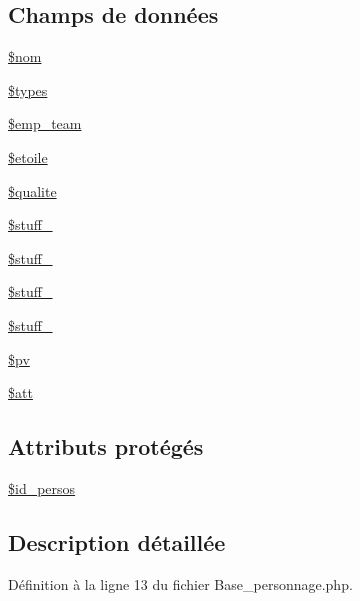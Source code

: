 \subsection*{Champs de données}
\begin{DoxyCompactItemize}
\item 
\mbox{\hyperlink{class_base__personnage_afd27c4f68e90081ac017ad811ceecc13}{\$nom}}
\item 
\mbox{\hyperlink{class_base__personnage_a9b93bd32a21d0fbecdd136edc1b5d4e4}{\$types}}
\item 
\mbox{\hyperlink{class_base__personnage_a2c671bc973d3bb997ecce969fc120b5f}{\$emp\+\_\+team}}
\item 
\mbox{\hyperlink{class_base__personnage_ae3abe8ba29b0b4af469fc48af7350f25}{\$etoile}}
\item 
\mbox{\hyperlink{class_base__personnage_a740e0ca5d6d55c3d196c465749504e0d}{\$qualite}}
\item 
\mbox{\hyperlink{class_base__personnage_a15cf5869509ee2bad46d637b1ec3e7d0}{\$stuff\+\_}}
\item 
\mbox{\hyperlink{class_base__personnage_a4e35acccaa1e6ef3a08f3c31f6a2dc4c}{\$stuff\+\_}}
\item 
\mbox{\hyperlink{class_base__personnage_a3c2204adf2a89f3bfff1cab97f460292}{\$stuff\+\_}}
\item 
\mbox{\hyperlink{class_base__personnage_a388da9ed289cf32963323619f228554b}{\$stuff\+\_}}
\item 
\mbox{\hyperlink{class_base__personnage_aa052dcb8719da97edec439217353a80b}{\$pv}}
\item 
\mbox{\hyperlink{class_base__personnage_a95a0c782140918824dcb403e4fe83db4}{\$att}}
\end{DoxyCompactItemize}
\subsection*{Attributs protégés}
\begin{DoxyCompactItemize}
\item 
\mbox{\hyperlink{class_base__personnage_a806b0b0a15951b2415539bd9560b7808}{\$id\+\_\+persos}}
\end{DoxyCompactItemize}


\subsection{Description détaillée}


Définition à la ligne 13 du fichier Base\+\_\+personnage.\+php.



